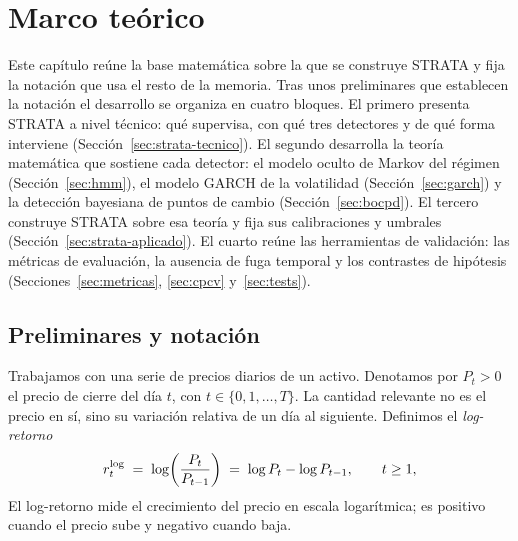 \chapter{Marco teórico}
\label{cap:marco-teorico}


Este capítulo reúne la base matemática sobre la que se construye STRATA y fija la notación que usa el resto de la memoria. Tras unos preliminares que establecen la notación el desarrollo se organiza en cuatro bloques. El primero presenta STRATA a nivel técnico: qué supervisa, con qué tres detectores y de qué forma interviene (Sección~\ref{sec:strata-tecnico}). El segundo desarrolla la teoría matemática que sostiene cada detector: el modelo oculto de Markov del régimen (Sección~\ref{sec:hmm}), el modelo GARCH de la volatilidad (Sección~\ref{sec:garch}) y la detección bayesiana de puntos de cambio (Sección~\ref{sec:bocpd}). El tercero construye STRATA sobre esa teoría y fija sus calibraciones y umbrales (Sección~\ref{sec:strata-aplicado}). El cuarto reúne las herramientas de validación: las métricas de evaluación, la ausencia de fuga temporal y los contrastes de hipótesis (Secciones~\ref{sec:metricas}, \ref{sec:cpcv} y~\ref{sec:tests}). 

\section{Preliminares y notación}
\label{sec:preliminares}

Trabajamos con una serie de precios diarios de un activo. Denotamos por $P_t > 0$ el precio de cierre del día $t$, con $t \in \{0, 1, \dots, T\}$. La cantidad relevante no es el precio en sí, sino su variación relativa de un día al siguiente. Definimos el \emph{log-retorno}
\[
r_t^{\log} \;=\; \log\!\left(\frac{P_t}{P_{t-1}}\right) \;=\; \log P_t - \log P_{t-1}, \qquad t \ge 1,
\]
El log-retorno mide el crecimiento del precio en escala logarítmica; es positivo cuando el precio sube y negativo cuando baja.

